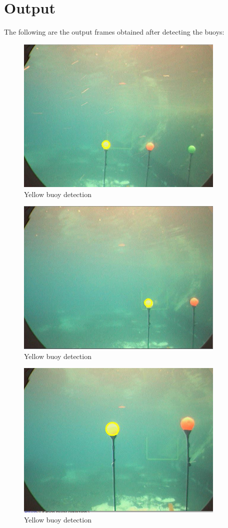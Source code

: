 \documentclass[12pt]{article}
\begin{document}
\section{Output}
The following are the output frames obtained after detecting the buoys:
\begin{figure}[h]
    \centering
    \includegraphics[width=10cm]{yellowbuoydetection}
    \caption{Yellow buoy detection}
    \label{fig:Yellow buoy detection}
\end{figure}
\begin{figure}[h]
    \centering
    \includegraphics[width=10cm]{yellowbuoydetection1}
    \caption{Yellow buoy detection}
    \label{fig:Yellow buoy detection}
\end{figure}
\newpage
\begin{figure}[h]
    \centering
    \includegraphics[width=10cm]{yellowbuoydetection2}
    \caption{Yellow buoy detection}
    \label{fig:Yellow buoy detection}
\end{figure}
\end{document}
